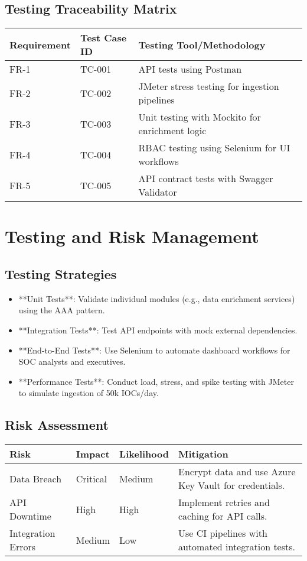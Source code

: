 \documentclass[12pt]{article}
\begin{document}
\subsection{Testing Traceability Matrix}
\begin{longtable}{|p{3cm}|p{4cm}|p{5cm}|}
\hline
\textbf{Requirement} & \textbf{Test Case ID} & \textbf{Testing Tool/Methodology} \\
\hline
FR-1 & TC-001 & API tests using Postman \\
\hline
FR-2 & TC-002 & JMeter stress testing for ingestion pipelines \\
\hline
FR-3 & TC-003 & Unit testing with Mockito for enrichment logic \\
\hline
FR-4 & TC-004 & RBAC testing using Selenium for UI workflows \\
\hline
FR-5 & TC-005 & API contract tests with Swagger Validator \\
\hline
\end{longtable}

\newpage

\section{Testing and Risk Management}
\subsection{Testing Strategies}
\begin{itemize}
    \item **Unit Tests**: Validate individual modules (e.g., data enrichment services) using the AAA pattern.
    \item **Integration Tests**: Test API endpoints with mock external dependencies.
    \item **End-to-End Tests**: Use Selenium to automate dashboard workflows for SOC analysts and executives.
    \item **Performance Tests**: Conduct load, stress, and spike testing with JMeter to simulate ingestion of 50k IOCs/day.
\end{itemize}

\subsection{Risk Assessment}
\begin{longtable}{|p{3cm}|p{4cm}|p{4cm}|p{4cm}|}
\hline
\textbf{Risk} & \textbf{Impact} & \textbf{Likelihood} & \textbf{Mitigation} \\ 
\hline
Data Breach & Critical & Medium & Encrypt data and use Azure Key Vault for credentials. \\ 
\hline
API Downtime & High & High & Implement retries and caching for API calls. \\ 
\hline
Integration Errors & Medium & Low & Use CI pipelines with automated integration tests. \\ 
\hline
\end{longtable}
\end{document}
